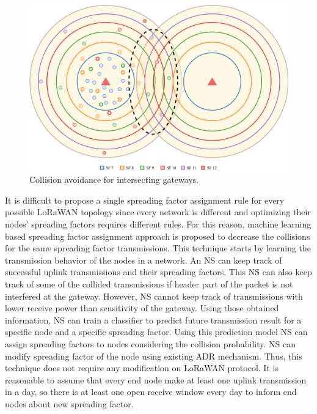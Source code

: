 \begin{figure}
\centering
\includegraphics[width=\linewidth]{fig/lora_multi_gw_collision_fix.png}
\vspace*{4mm}
\caption{Collision avoidance for intersecting gateways.}
\label{fig:collision_solution_multi_gw}
\end{figure}

It is difficult to propose a single spreading factor assignment rule for every possible LoRaWAN topology since every network is different and optimizing their nodes' spreading factors requires different rules. For this reason, machine learning based spreading factor assignment approach is proposed to decrease the collisions for the same spreading factor transmissions. This technique starts by learning the transmission behavior of the nodes in a network. An NS can keep track of successful uplink transmissions and their spreading factors. This NS can also keep track of some of the collided transmissions if header part of the packet is not interfered at the gateway. However, NS cannot keep track of transmissions with lower receive power than sensitivity of the gateway. Using those obtained information, NS can train a classifier to predict future transmission result for a specific node and a specific spreading factor. Using this prediction model NS can assign spreading factors to nodes considering the collision probability. NS can modify spreading factor of the node using existing ADR mechanism. Thus, this technique does not require any modification on LoRaWAN protocol. It is reasonable to assume that every end node make at least one uplink transmission in a day, so there is at least one open receive window every day to inform end nodes about new spreading factor.

